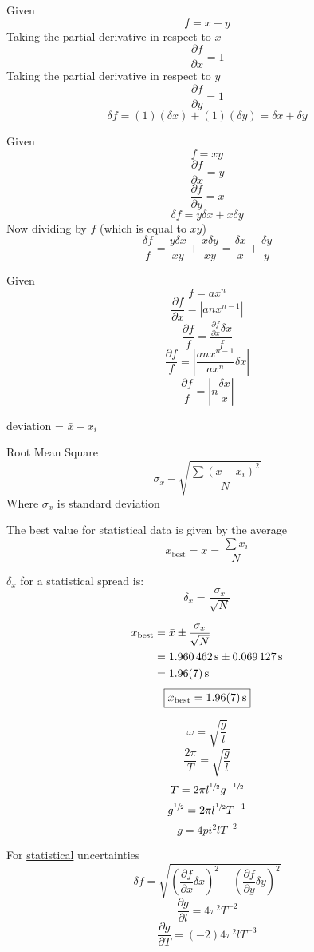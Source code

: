 \documentclass{article}
\begin{document}
\hr

Given
$$ f = x + y $$
Taking the partial derivative in respect to $ x $
$$ \frac{\partial f}{\partial x} = 1 $$
Taking the partial derivative in respect to $ y $
$$ \frac{\partial f}{\partial y} = 1 $$
$$ \delta f = (1)(\delta x) + (1)(\delta y) = \delta x + \delta y $$

\hr

Given
$$ f = xy $$
$$ \frac{\partial f}{\partial x} = y $$
$$ \frac{\partial f}{\partial y} = x $$
$$ \delta f = y \delta x + x \delta y $$
Now dividing by $ f $ (which is equal to $ xy $)
$$ \frac{\delta f}{f} = \frac{y\delta x}{xy} + \frac{x\delta y}{xy} = \frac{\delta x}{x} + \frac{\delta y}{y} $$

\hr

Given
$$ f = ax^n $$
$$ \frac{\partial f}{\partial x} = \left| anx^{n-1} \right| $$
$$ \frac{\partial f}{f} = \frac{\frac{\partial f}{\partial x}\delta x}{f} $$
$$ \frac{\partial f}{f} = \left| \frac{anx^{n-1}}{ax^n}\delta x \right| $$
$$ \frac{\partial f}{f} = \left| n\frac{\delta x}{x} \right| $$

\hr

deviation = $ \bar{x} - x_i $

Root Mean Square
$$ \sigma_x - \sqrt{\frac{\sum (\bar{x}-x_i)^2}{N}} $$
Where $ \sigma_x $ is standard deviation

The best value for statistical data is given by the average
$$ x_{\text{best}} = \bar{x} = \frac{\sum x_i}{N} $$

$ \delta_x $ for a statistical spread is:
$$ \delta_x = \frac{\sigma_x}{\sqrt{N}} $$

\begin{align*}
	x_\text{best} & = \bar{x} \pm \frac{\sigma_x}{\sqrt{N}} \\
				  & = \SI{1.960462}{\second} \pm \SI{0.069127}{\second} \\
				  & = \SI{1.96 \pm 0.07}{\second}
\end{align*}
\begin{equation*}
	\boxed{
		x_\text{best} = \SI{1.96 \pm 0.07}{\second}
	}
\end{equation*}

\hr

$$ \omega = \sqrt{\frac{g}{l}} $$
$$ \frac{2\pi}{T} = \sqrt{\frac{g}{l}} $$
$$ T = 2\pi l^{\sfrac{1}{2}} g^{-\sfrac{1}{2}} $$
$$ g^{\sfrac{1}{2}} = 2\pi l^{\sfrac{1}{2}} T^{-1} $$
$$ g = 4pi^2 l T^{-2} $$

\hr

For \underline{statistical} uncertainties
$$ \delta f = \sqrt{ \left( \frac{\partial f}{\partial x}\delta x \right)^2 + \left( \frac{\partial f}{\partial y}\delta y \right)^2 } $$
$$ \frac{\partial g}{\partial l} = 4\pi^2T^{-2} $$
$$ \frac{\partial g}{\partial T} = (-2)4\pi^2lT^{-3} $$
\end{document}
